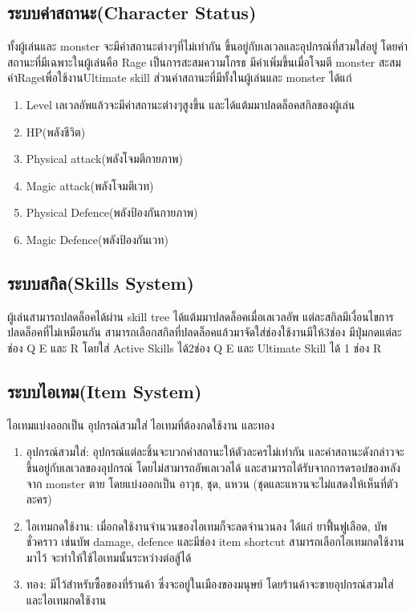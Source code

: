 \subsection{ระบบค่าสถานะ(Character Status) }
ทั้งผู้เล่นและ monster จะมีค่าสถานะต่างๆที่ไม่เท่ากัน ขึ้นอยู่กับเลเวลและอุปกรณ์ที่สวมใส่อยู่
โดยค่าสถานะที่มีเฉพาะในผู้เล่นคือ Rage เป็นการสะสมความโกรธ มีค่าเพิ่มขึ้นเมื่อโจมตี monster สะสมค่าRageเพื่อใช้งานUltimate skill 
ส่วนค่าสถานะที่มีทั้งในผู้เล่นและ monster ได้แก่
\begin{enumerate}
\item Level เลเวลอัพแล้วจะมีค่าสถานะต่างๆสูงขึ้น และได้แต้มมาปลดล็อคสกิลของผู้เล่น
\item HP(พลังชีวิต)
\item Physical attack(พลังโจมตีกายภาพ)
\item Magic attack(พลังโจมตีเวท)
\item Physical Defence(พลังป้องกันกายภาพ)
\item Magic Defence(พลังป้องกันเวท)
\end{enumerate}

\subsection{ระบบสกิล(Skills System)}
ผู้เล่นสามารถปลดล็อคได้ผ่าน skill tree ได้แต้มมาปลดล็อคเมื่อเลเวลอัพ แต่ละสกิลมีเงื่อนไขการปลดล็อคที่ไม่เหมือนกัน สามารถเลือกสกิลที่ปลดล็อคแล้วมาจัดใส่ช่องใช้งานมีให้3ช่อง มีปุ่มกดแต่ละช่อง Q E และ R โดยใส่ Active Skills ได้2ช่อง Q E และ Ultimate Skill ได้ 1 ช่อง R

\subsection{ระบบไอเทม(Item System)}
ไอเทมแบ่งออกเป็น อุปกรณ์สวมใส่ ไอเทมที่ต้องกดใช้งาน และทอง

\begin{enumerate}
\item อุปกรณ์สวมใส่: อุปกรณ์แต่ละชิ้นจะบวกค่าสถานะให้ตัวละครไม่เท่ากัน และค่าสถานะดังกล่าวจะขึ้นอยู่กับเลเวลของอุปกรณ์ โดยไม่สามารถอัพเลเวลได้ และสามารถได้รับจากการดรอปของหลังจาก monster ตาย โดยแบ่งออกเป็น อาวุธ, ชุด, แหวน (ชุดและแหวนจะไม่แสดงให้เห็นที่ตัวละคร)
\item ไอเทมกดใช้งาน: เมื่อกดใช้งานจำนวนของไอเทมก็จะลดจำนวนลง ได้แก่ ยาฟื้นฟูเลือด, บัพชั่วคราว เช่นบัพ damage, defence  และมีช่อง item shortcut สามารถเลือกไอเทมกดใช้งานมาไว้ จะทำให้ใช้ไอเทมนั้นระหว่างต่อสู้ได้
\item ทอง: มีไว้สำหรับซื้อของที่ร้านค้า ซึ่งจะอยู่ในเมืองของมนุษย์ โดยร้านค้าจะขายอุปกรณ์สวมใส่ และไอเทมกดใช้งาน
\end{enumerate}

